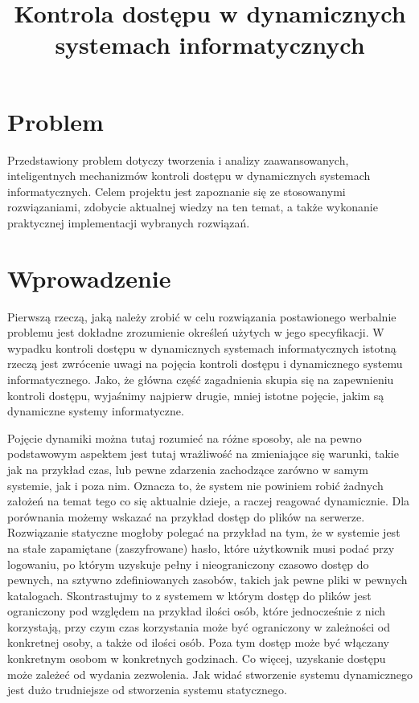 \documentclass{classrep}
\author{
  \studentinfo{Mateusz Grotek}{186816} \and
  \studentinfo{Mateusz Jakóbczak}{186819} \and
  \studentinfo{Rafał Jurkiewicz}{186822} \and
  \studentinfo{Łukasz Kotyński}{186829} \and
  \studentinfo{Paweł Tarasiuk}{186875}
}
\title{Kontrola dostępu w dynamicznych systemach informatycznych}
\begin{document}
\maketitle

\section{Problem}
Przedstawiony problem dotyczy tworzenia i analizy zaawansowanych, inteligentnych mechanizmów kontroli dostępu w dynamicznych systemach informatycznych. Celem projektu jest
zapoznanie się ze stosowanymi rozwiązaniami, zdobycie aktualnej wiedzy na ten temat, a także wykonanie praktycznej implementacji wybranych rozwiązań.
\section{Wprowadzenie}
Pierwszą rzeczą, jaką należy zrobić w celu rozwiązania postawionego werbalnie problemu jest dokładne zrozumienie określeń użytych w jego specyfikacji. W wypadku
kontroli dostępu w dynamicznych systemach informatycznych istotną rzeczą jest zwrócenie uwagi na pojęcia kontroli dostępu i dynamicznego systemu informatycznego. Jako, że główna
część zagadnienia skupia się na zapewnieniu kontroli dostępu, wyjaśnimy najpierw drugie, mniej istotne pojęcie, jakim są dynamiczne systemy informatyczne.

Pojęcie dynamiki można tutaj
rozumieć na różne sposoby, ale na pewno podstawowym aspektem jest tutaj wrażliwość na zmieniające się warunki, takie jak na przykład czas, lub pewne zdarzenia zachodzące zarówno 
w samym systemie, jak i poza nim. Oznacza to, że system nie powiniem robić żadnych założeń na temat tego co się aktualnie dzieje, a raczej reagować dynamicznie. Dla porównania
możemy wskazać na przykład dostęp do plików na serwerze. Rozwiązanie statyczne mogłoby polegać na przykład na tym, że w systemie jest na stałe zapamiętane (zaszyfrowane) hasło,
które użytkownik musi podać przy logowaniu, po którym uzyskuje pełny i nieograniczony czasowo dostęp do pewnych, na sztywno zdefiniowanych zasobów, takich jak pewne pliki w pewnych katalogach.
Skontrastujmy to z systemem w którym dostęp do plików jest ograniczony pod względem na przykład ilości osób, które jednocześnie z nich korzystają, przy czym czas korzystania może być ograniczony
w zależności od konkretnej osoby, a także od ilości osób. Poza tym dostęp może być włączany konkretnym osobom w konkretnych godzinach. Co więcej, uzyskanie dostępu może zależeć od
wydania zezwolenia. Jak widać stworzenie systemu dynamicznego jest dużo trudniejsze od stworzenia systemu statycznego.
\end{document}
